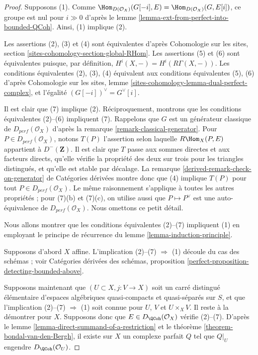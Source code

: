 \begin{proof}
Supposons (1). Comme
$\Hom_{D(\mathcal{O}_X)}(G[-i],E)=\Hom_{D(\mathcal{O}_X)}(G,E[i])$, ce groupe
est nul pour $i\gg0$ d'apr\`es le lemme
\ref{lemma-ext-from-perfect-into-bounded-QCoh}. Ainsi, (1) implique (2).

\medskip\noindent
Les assertions (2), (3) et (4) sont \'equivalentes d'apr\`es Cohomologie sur
les sites, section \ref{sites-cohomology-section-global-RHom}.
Les assertions (5) et (6) sont \'equivalentes puisque, par d\'efinition,
$H^i(X,-)=H^i(R\Gamma(X,-))$. Les conditions \'equivalentes (2), (3), (4)
\'equivalent aux conditions \'equivalentes (5), (6) d'apr\`es Cohomologie sur
les sites, lemme \ref{sites-cohomology-lemma-dual-perfect-complex}, et
l'\'egalit\'e $(G[-i])^\vee=G^\vee[i]$.

\medskip\noindent
Il est clair que (7) implique (2). R\'eciproquement, montrons que les conditions
\'equivalentes (2)--(6) impliquent (7). Rappelons que $G$ est un g\'en\'erateur
classique de $D_{perf}(\mathcal{O}_X)$ d'apr\`es la remarque
\ref{remark-classical-generator}. Pour $P\in D_{perf}(\mathcal{O}_X)$, notons
$T(P)$ l'assertion selon laquelle $R\Hom_X(P,E)$ appartient \`a
$D^-(\mathbf{Z})$. Il est clair que $T$ passe aux sommes directes et aux
facteurs directs, qu'elle v\'erifie la propri\'et\'e des deux sur trois pour les
triangles distingu\'es, et qu'elle est stable par d\'ecalage. La remarque
\ref{derived-remark-check-on-generator} de Cat\'egories d\'eriv\'ees montre donc
que (4) implique $T(P)$ pour tout $P\in D_{perf}(\mathcal{O}_X)$. Le m\^eme
raisonnement s'applique \`a toutes les autres propri\'et\'es ; pour (7)(b) et
(7)(c), on utilise aussi que $P\mapsto P^\vee$ est une auto-\'equivalence de
$D_{perf}(\mathcal{O}_X)$. Nous omettons ce petit d\'etail.

\medskip\noindent
Nous allons montrer que les conditions \'equivalentes (2)--(7) impliquent (1)
en employant le principe de r\'ecurrence du lemme
\ref{lemma-induction-principle}.

\medskip\noindent
Supposons d'abord $X$ affine. L'implication (2)--(7) $\Rightarrow$ (1) d\'ecoule
du cas des sch\'emas ; voir Cat\'egories d\'eriv\'ees des sch\'emas, proposition
\ref{perfect-proposition-detecting-bounded-above}.

\medskip\noindent
Supposons maintenant que $(U\subset X,j:V\to X)$ soit un carr\'e distingu\'e
\'el\'ementaire d'espaces alg\'ebriques quasi-compacts et quasi-s\'epar\'es sur
$S$, et que l'implication (2)--(7) $\Rightarrow$ (1) soit connue pour $U$, $V$
et $U\times_XV$. Il reste \`a la d\'emontrer pour $X$. Supposons donc que
$E\in D_\QCoh(\mathcal{O}_X)$ v\'erifie (2)--(7). D'apr\`es le lemme
\ref{lemma-direct-summand-of-a-restriction} et le th\'eor\`eme
\ref{theorem-bondal-van-den-Bergh}, il existe sur $X$ un complexe parfait $Q$
tel que $Q|_U$ engendre $D_\QCoh(\mathcal{O}_U)$.


\end{proof}

